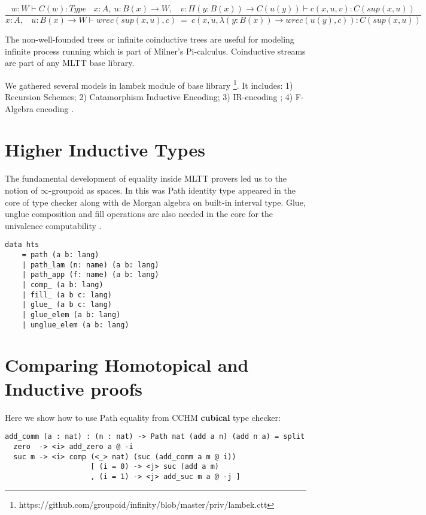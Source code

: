 \documentclass{aip-cp}
\begin{document}
\begin{equation}
\tag{$W$-computation}
\dfrac
{w: W \vdash C(w) : Type\ \ \ \ x:A,\ u:B(x) \rightarrow W,\ \ \ \ v:\Pi (y:B(x)) \rightarrow C(u(y)) \vdash c(x,u,v):C(sup(x,u))}
{x:A,\ \ \ \ u:B(x) \rightarrow W \vdash wrec(sup(x,u),c)\ =\ c(x,u,\lambda (y:B(x)) \rightarrow wrec(u(y),c)):C(sup(x,u))}
\end{equation}

The non-well-founded trees or infinite coinductive trees \cite{Jacobs97,Basold16}
are useful for modeling infinite process running which is
part of Milner's Pi-calculus. Coinductive streams are
part of any MLTT base library.

We gathered several models in lambek module of base library \footnote{https://github.com/groupoid/infinity/blob/master/priv/lambek.ctt}.
It includes:
1) Recursion Schemes;
2) Catamorphism Inductive Encoding;
3) IR-encoding \cite{Dagand13};
4) F-Algebra encoding  \cite{Hinze13}.

\section{Higher Inductive Types}

The fundamental development of equality inside MLTT
provers led us to the notion of $\infty$-groupoid \cite{Streicher95} as spaces.
In this was Path identity type appeared in the core
of type checker along with de Morgan algebra on
built-in interval type. Glue, unglue composition
and fill operations are also needed in the core
for the univalence computability \cite{Mortberg17}.

\begin{lstlisting}[mathescape=true]
data hts
    = path (a b: lang)
    | path_lam (n: name) (a b: lang)
    | path_app (f: name) (a b: lang)
    | comp_ (a b: lang)
    | fill_ (a b c: lang)
    | glue_ (a b c: lang)
    | glue_elem (a b: lang)
    | unglue_elem (a b: lang)
\end{lstlisting}

\section{Comparing Homotopical and Inductive proofs}

Here we show how to use Path equality from CCHM {\bf cubical} type checker:

\begin{lstlisting}[mathescape=true]
add_comm (a : nat) : (n : nat) -> Path nat (add a n) (add n a) = split
  zero  -> <i> add_zero a @ -i
  suc m -> <i> comp (<_> nat) (suc (add_comm a m @ i))
                    [ (i = 0) -> <j> suc (add a m)
                    , (i = 1) -> <j> add_suc m a @ -j ]
\end{lstlisting}
\end{document}
